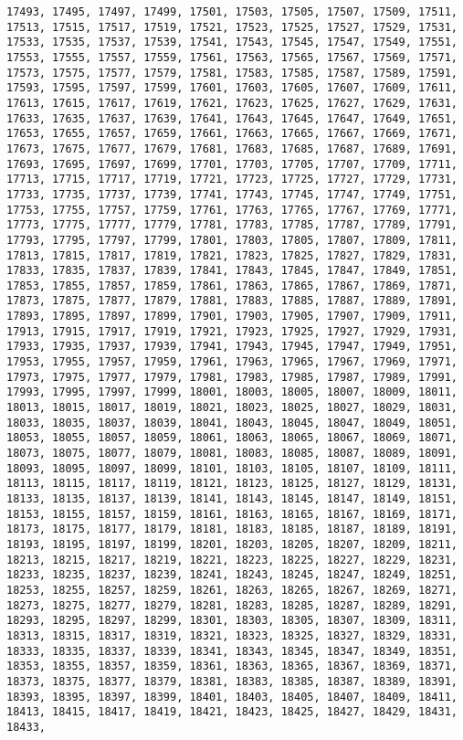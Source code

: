 \documentclass[11pt]{article}
\begin{document}
\begin{Verbatim}[commandchars=\\\{\}]
17493, 17495, 17497, 17499, 17501, 17503, 17505, 17507, 17509, 17511, 17513, 17515, 17517, 17519, 17521, 17523, 17525, 17527, 17529, 17531, 17533, 17535, 17537, 17539, 17541, 17543, 17545, 17547, 17549, 17551, 17553, 17555, 17557, 17559, 17561, 17563, 17565, 17567, 17569, 17571, 17573, 17575, 17577, 17579, 17581, 17583, 17585, 17587, 17589, 17591, 17593, 17595, 17597, 17599, 17601, 17603, 17605, 17607, 17609, 17611, 17613, 17615, 17617, 17619, 17621, 17623, 17625, 17627, 17629, 17631, 17633, 17635, 17637, 17639, 17641, 17643, 17645, 17647, 17649, 17651, 17653, 17655, 17657, 17659, 17661, 17663, 17665, 17667, 17669, 17671, 17673, 17675, 17677, 17679, 17681, 17683, 17685, 17687, 17689, 17691, 17693, 17695, 17697, 17699, 17701, 17703, 17705, 17707, 17709, 17711, 17713, 17715, 17717, 17719, 17721, 17723, 17725, 17727, 17729, 17731, 17733, 17735, 17737, 17739, 17741, 17743, 17745, 17747, 17749, 17751, 17753, 17755, 17757, 17759, 17761, 17763, 17765, 17767, 17769, 17771, 17773, 17775, 17777, 17779, 17781, 17783, 17785, 17787, 17789, 17791, 17793, 17795, 17797, 17799, 17801, 17803, 17805, 17807, 17809, 17811, 17813, 17815, 17817, 17819, 17821, 17823, 17825, 17827, 17829, 17831, 17833, 17835, 17837, 17839, 17841, 17843, 17845, 17847, 17849, 17851, 17853, 17855, 17857, 17859, 17861, 17863, 17865, 17867, 17869, 17871, 17873, 17875, 17877, 17879, 17881, 17883, 17885, 17887, 17889, 17891, 17893, 17895, 17897, 17899, 17901, 17903, 17905, 17907, 17909, 17911, 17913, 17915, 17917, 17919, 17921, 17923, 17925, 17927, 17929, 17931, 17933, 17935, 17937, 17939, 17941, 17943, 17945, 17947, 17949, 17951, 17953, 17955, 17957, 17959, 17961, 17963, 17965, 17967, 17969, 17971, 17973, 17975, 17977, 17979, 17981, 17983, 17985, 17987, 17989, 17991, 17993, 17995, 17997, 17999, 18001, 18003, 18005, 18007, 18009, 18011, 18013, 18015, 18017, 18019, 18021, 18023, 18025, 18027, 18029, 18031, 18033, 18035, 18037, 18039, 18041, 18043, 18045, 18047, 18049, 18051, 18053, 18055, 18057, 18059, 18061, 18063, 18065, 18067, 18069, 18071, 18073, 18075, 18077, 18079, 18081, 18083, 18085, 18087, 18089, 18091, 18093, 18095, 18097, 18099, 18101, 18103, 18105, 18107, 18109, 18111, 18113, 18115, 18117, 18119, 18121, 18123, 18125, 18127, 18129, 18131, 18133, 18135, 18137, 18139, 18141, 18143, 18145, 18147, 18149, 18151, 18153, 18155, 18157, 18159, 18161, 18163, 18165, 18167, 18169, 18171, 18173, 18175, 18177, 18179, 18181, 18183, 18185, 18187, 18189, 18191, 18193, 18195, 18197, 18199, 18201, 18203, 18205, 18207, 18209, 18211, 18213, 18215, 18217, 18219, 18221, 18223, 18225, 18227, 18229, 18231, 18233, 18235, 18237, 18239, 18241, 18243, 18245, 18247, 18249, 18251, 18253, 18255, 18257, 18259, 18261, 18263, 18265, 18267, 18269, 18271, 18273, 18275, 18277, 18279, 18281, 18283, 18285, 18287, 18289, 18291, 18293, 18295, 18297, 18299, 18301, 18303, 18305, 18307, 18309, 18311, 18313, 18315, 18317, 18319, 18321, 18323, 18325, 18327, 18329, 18331, 18333, 18335, 18337, 18339, 18341, 18343, 18345, 18347, 18349, 18351, 18353, 18355, 18357, 18359, 18361, 18363, 18365, 18367, 18369, 18371, 18373, 18375, 18377, 18379, 18381, 18383, 18385, 18387, 18389, 18391, 18393, 18395, 18397, 18399, 18401, 18403, 18405, 18407, 18409, 18411, 18413, 18415, 18417, 18419, 18421, 18423, 18425, 18427, 18429, 18431, 18433, 
\end{Verbatim}
\end{document}
